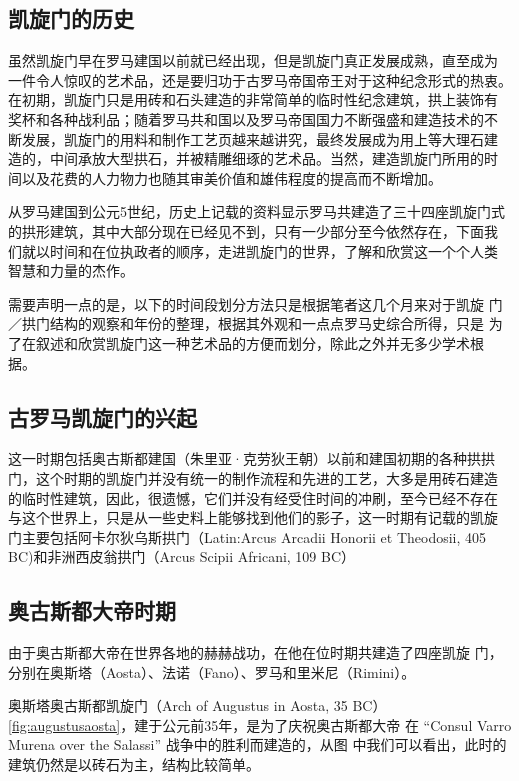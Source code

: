 \documentclass[a4paper,dvipdfm]{article}
\begin{document}
\subsection{凯旋门的历史}

虽然凯旋门早在罗马建国以前就已经出现，但是凯旋门真正发展成熟，直至成为
一件令人惊叹的艺术品，还是要归功于古罗马帝国帝王对于这种纪念形式的热衷。
在初期，凯旋门只是用砖和石头建造的非常简单的临时性纪念建筑，拱上装饰有
奖杯和各种战利品；随着罗马共和国以及罗马帝国国力不断强盛和建造技术的不
断发展，凯旋门的用料和制作工艺页越来越讲究，最终发展成为用上等大理石建
造的，中间承放大型拱石，并被精雕细琢的艺术品。当然，建造凯旋门所用的时
间以及花费的人力物力也随其审美价值和雄伟程度的提高而不断增加。

从罗马建国到公元5世纪，历史上记载的资料显示罗马共建造了三十四座凯旋门式
的拱形建筑，其中大部分现在已经见不到，只有一少部分至今依然存在，下面我
们就以时间和在位执政者的顺序，走进凯旋门的世界，了解和欣赏这一个个人类
智慧和力量的杰作。

需要声明一点的是，以下的时间段划分方法只是根据笔者这几个月来对于凯旋
门／拱门结构的观察和年份的整理，根据其外观和一点点罗马史综合所得，只是
为了在叙述和欣赏凯旋门这一种艺术品的方便而划分，除此之外并无多少学术根
据。

\subsection{古罗马凯旋门的兴起}

这一时期包括奥古斯都建国（朱里亚·克劳狄王朝）以前和建国初期的各种拱拱
门，这个时期的凯旋门并没有统一的制作流程和先进的工艺，大多是用砖石建造
的临时性建筑，因此，很遗憾，它们并没有经受住时间的冲刷，至今已经不存在
与这个世界上，只是从一些史料上能够找到他们的影子，这一时期有记载的凯旋
门主要包括阿卡尔狄乌斯拱门（Latin:Arcus Arcadii Honorii et Theodosii,
405 BC)和非洲西皮翁拱门（Arcus Scipii Africani, 109 BC）

\subsection{奥古斯都大帝时期}

由于奥古斯都大帝在世界各地的赫赫战功，在他在位时期共建造了四座凯旋
门，分别在奥斯塔（Aosta）、法诺（Fano）、罗马和里米尼（Rimini）。

奥斯塔奥古斯都凯旋门（Arch of Augustus in Aosta, 35
BC）\ref{fig:augustusaosta}，建于公元前35年，是为了庆祝奥古斯都大帝
在 ``Consul Varro Murena over the Salassi'' 战争中的胜利而建造的，从图
中我们可以看出，此时的建筑仍然是以砖石为主，结构比较简单。
\end{document}
